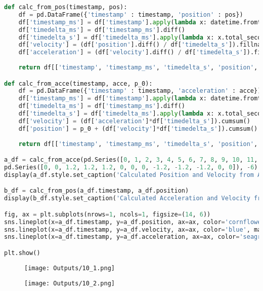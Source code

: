 \documentclass{article}
\begin{document}
\begin{latin}
\begin{lstlisting}[language=Python]
def calc_from_pos(timestamp, pos):
	df = pd.DataFrame({'timestamp' : timestamp, 'position' : pos})
	df['timestamp_ms'] = df['timestamp'].apply(lambda x: datetime.fromtimestamp(x/1000.0))
	df['timedelta_ms'] = df['timestamp_ms'].diff()
	df['timedelta_s'] = df['timedelta_ms'].apply(lambda x: x.total_seconds()).fillna(0)
	df['velocity'] = (df['position'].diff() / df['timedelta_s']).fillna(0)
	df['acceleration'] = (df['velocity'].diff() / df['timedelta_s']).fillna(0)
	
	return df[['timestamp', 'timestamp_ms', 'timedelta_s', 'position', 'velocity', 'acceleration']]

def calc_from_acce(timestamp, acce, p_0):
	df = pd.DataFrame({'timestamp' : timestamp, 'acceleration' : acce})
	df['timestamp_ms'] = df['timestamp'].apply(lambda x: datetime.fromtimestamp(x/1000.0))
	df['timedelta_ms'] = df['timestamp_ms'].diff()
	df['timedelta_s'] = df['timedelta_ms'].apply(lambda x: x.total_seconds()).fillna(0)
	df['velocity'] = (df['acceleration']*df['timedelta_s']).cumsum()
	df['position'] = p_0 + (df['velocity']*df['timedelta_s']).cumsum()
	
	return df[['timestamp', 'timestamp_ms', 'timedelta_s', 'position', 'velocity', 'acceleration']]

a_df = calc_from_acce(pd.Series([0, 1, 2, 3, 4, 5, 6, 7, 8, 9, 10, 11, 12]) * 1000 + start_time, 
pd.Series([0, 0, 1.2, 1.2, 1.2, 0, 0, 0, -1.2, -1.2, -1.2, 0, 0]), -6)
display(a_df.style.set_caption('Calculated Position and Velocity from Acceleration'))

b_df = calc_from_pos(a_df.timestamp, a_df.position)
display(b_df.style.set_caption('Calculated Acceleration and Velocity from Position'))

fig, ax = plt.subplots(nrows=1, ncols=1, figsize=(14, 6))
sns.lineplot(x=a_df.timestamp, y=a_df.position, ax=ax, color='cornflowerblue', marker='o', label='Position ($m$)')
sns.lineplot(x=a_df.timestamp, y=a_df.velocity, ax=ax, color='blue', marker='o', label='Velocity ($m/s$)')
sns.lineplot(x=a_df.timestamp, y=a_df.acceleration, ax=ax, color='seagreen', marker='o', label='Acceleration ($m/s^2$)')

plt.show()		
\end{lstlisting}
\end{latin}
\pagebreak
\begin{figure}[hbt!]
	\centering
	\texttt{[image: Outputs/10\_1.png]}
\end{figure}
\begin{figure}[hbt!]
	\centering
	\texttt{[image: Outputs/10\_2.png]}
\end{figure}
\ \\
\end{document}
